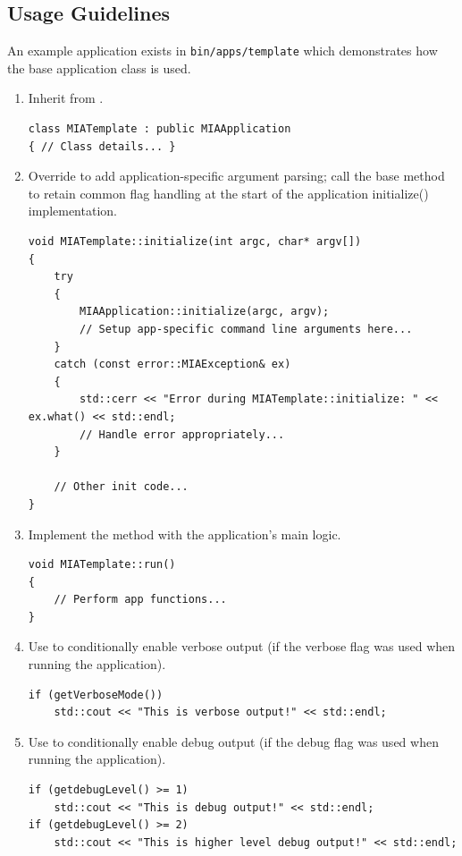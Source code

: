 \subsection{Usage Guidelines}
An example application exists in \texttt{bin/apps/template} which demonstrates how the base application class is used.
\begin{enumerate}
	\item Inherit from .
	\begin{lstlisting}[style=cppstyle]
class MIATemplate : public MIAApplication
{ // Class details... }
	\end{lstlisting}

	\item Override  to add application-specific argument parsing; call the base method to retain common flag handling at the start of the application initialize() implementation.
	\begin{lstlisting}[style=cppstyle]
void MIATemplate::initialize(int argc, char* argv[])
{
	try
	{    
		MIAApplication::initialize(argc, argv);	
		// Setup app-specific command line arguments here...
	}
	catch (const error::MIAException& ex)
	{
		std::cerr << "Error during MIATemplate::initialize: " << ex.what() << std::endl;
		// Handle error appropriately...
	}

	// Other init code...
}
	\end{lstlisting}

	\item Implement the  method with the application's main logic.
	\begin{lstlisting}[style=cppstyle]
void MIATemplate::run()
{
	// Perform app functions...
}
	\end{lstlisting}

	\item Use  to conditionally enable verbose output (if the verbose flag was used when running the application).
	\begin{lstlisting}[style=cppstyle]
if (getVerboseMode())
    std::cout << "This is verbose output!" << std::endl;
	\end{lstlisting}

	\item Use  to conditionally enable debug output (if the debug flag was used when running the application).
\begin{lstlisting}[style=cppstyle]
if (getdebugLevel() >= 1)
	std::cout << "This is debug output!" << std::endl;
if (getdebugLevel() >= 2)
	std::cout << "This is higher level debug output!" << std::endl;
\end{lstlisting}


\end{enumerate}
